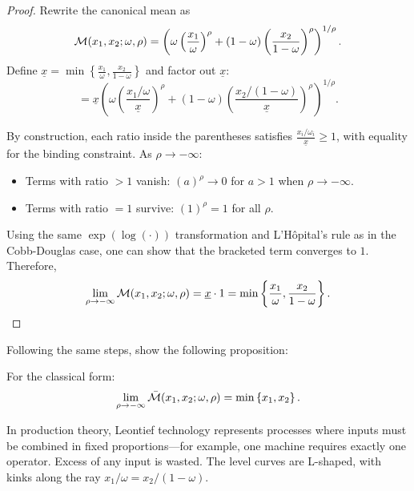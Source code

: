 \begin{proof}
Rewrite the canonical mean as
\[
\mathcal{M}(x_1, x_2; \omega, \rho) = \left( \omega \left( \frac{x_1}{\omega} \right)^\rho + (1-\omega) \left( \frac{x_2}{1-\omega} \right)^\rho \right)^{1/\rho}.
\]
Define $\underline{x} = \min\left\{ \frac{x_1}{\omega}, \frac{x_2}{1-\omega} \right\}$ and factor out $\underline{x}$:
\[
= \underline{x} \left( \omega \left( \frac{x_1/\omega}{\underline{x}} \right)^\rho + (1-\omega) \left( \frac{x_2/(1-\omega)}{\underline{x}} \right)^\rho \right)^{1/\rho}.
\]

By construction, each ratio inside the parentheses satisfies $\frac{x_i/\omega_i}{\underline{x}} \geq 1$, with equality for the binding constraint. As $\rho \to -\infty$:
\begin{itemize}[leftmargin=1.5em]
    \item Terms with ratio $> 1$ vanish: $(a)^\rho \to 0$ for $a > 1$ when $\rho \to -\infty$.
    \item Terms with ratio $= 1$ survive: $(1)^\rho = 1$ for all $\rho$.
\end{itemize}
Using the same $\exp(\log(\cdot))$ transformation and L'Hôpital's rule as in the Cobb-Douglas case, one can show that the bracketed term converges to $1$. Therefore,
\[
\lim_{\rho \to -\infty} \mathcal{M}(x_1, x_2; \omega, \rho) = \underline{x} \cdot 1 = \min\left\{ \frac{x_1}{\omega}, \frac{x_2}{1-\omega} \right\}.
\]
\end{proof}
\begin{callouttip}[Exercise]
Following the same steps, show the following proposition:
\begin{proposition}
\label{prop:leontief-classical}
For the classical form:
\begin{equation}
\label{eq:leontief-classical}
\lim_{\rho \to -\infty} \bar{\mathcal{M}}(x_1, x_2; \omega, \rho) = \min\left\{ x_1, x_2 \right\}.
\end{equation}
\end{proposition}
\end{callouttip}

\begin{calloutnote}
In production theory, Leontief technology represents processes where inputs must be combined in fixed proportions---for example, one machine requires exactly one operator. Excess of any input is wasted. The level curves are L-shaped, with kinks along the ray $x_1/\omega = x_2/(1-\omega)$.
\end{calloutnote}

